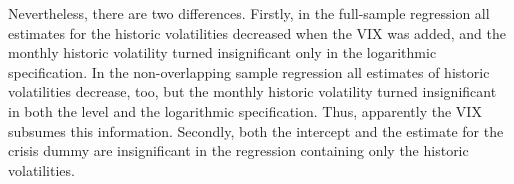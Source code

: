 Nevertheless, there are two differences. Firstly, in the full-sample regression all estimates for the historic volatilities decreased when the VIX was added, and the monthly historic volatility turned insignificant only in the logarithmic specification. In the non-overlapping sample regression all estimates of historic volatilities decrease, too, but the monthly historic volatility turned insignificant in both the level and the logarithmic specification. Thus, apparently the VIX subsumes this information. Secondly, both the intercept and the estimate for the crisis dummy are insignificant in the regression containing only the historic volatilities.


\newpage
















